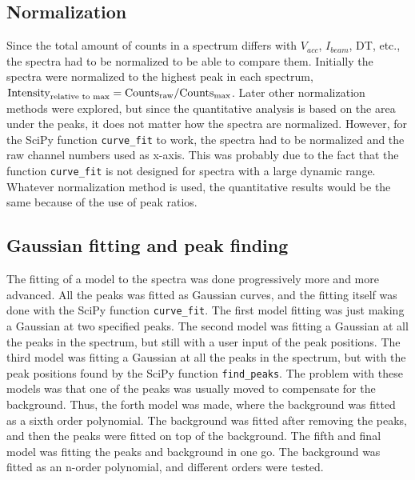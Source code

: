 \subsection{Normalization}
\label{sec:method:treatment:normalization}
Since the total amount of counts in a spectrum differs with $V_{acc}$, $I_{beam}$, DT, etc., the spectra had to be normalized to be able to compare them.
Initially the spectra were normalized to the highest peak in each spectrum, $\textnormal{Intensity}_{\textnormal{relative to max}} = \textnormal{Counts}_{\textnormal{raw}} / \textnormal{Counts}_{\textnormal{max}}$.
Later other normalization methods were explored, but since the quantitative analysis is based on the area under the peaks, it does not matter how the spectra are normalized.
However, for the SciPy function \verb|curve_fit| to work, the spectra had to be normalized and the raw channel numbers used as x-axis.
This was probably due to the fact that the function \verb|curve_fit| is not designed for spectra with a large dynamic range.
Whatever normalization method is used, the quantitative results would be the same because of the use of peak ratios.

\subsection{Gaussian fitting and peak finding}
\label{sec:method:treatment:fitting}
The fitting of a model to the spectra was done progressively more and more advanced.
All the peaks was fitted as Gaussian curves, and the fitting itself was done with the SciPy function \verb|curve_fit|.
The first model fitting was just making a Gaussian at two specified peaks.
The second model was fitting a Gaussian at all the peaks in the spectrum, but still with a user input of the peak positions.
The third model was fitting a Gaussian at all the peaks in the spectrum, but with the peak positions found by the SciPy function \verb|find_peaks|.
The problem with these models was that one of the peaks was usually moved to compensate for the background.
Thus, the forth model was made, where the background was fitted as a sixth order polynomial.
The background was fitted after removing the peaks, and then the peaks were fitted on top of the background.
The fifth and final model was fitting the peaks and background in one go.
The background was fitted as an n-order polynomial, and different orders were tested.



